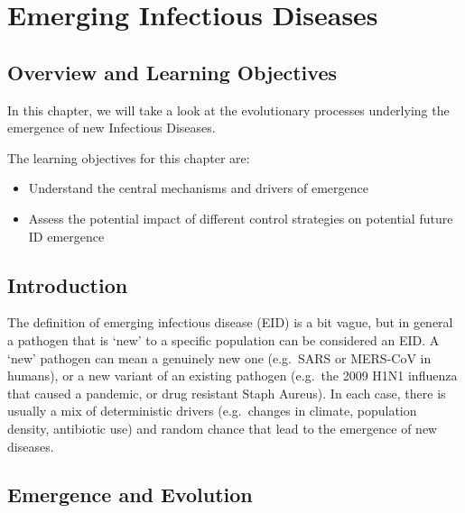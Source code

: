 \documentclass[
]{book}
\providecommand{\tightlist}{%
  \setlength{\itemsep}{0pt}\setlength{\parskip}{0pt}}
\begin{document}
\hypertarget{emerging-infectious-diseases}{%
\chapter{Emerging Infectious Diseases}\label{emerging-infectious-diseases}}

\hypertarget{overview-and-learning-objectives-15}{%
\section{Overview and Learning Objectives}\label{overview-and-learning-objectives-15}}

In this chapter, we will take a look at the evolutionary processes underlying the emergence of new Infectious Diseases.

The learning objectives for this chapter are:

\begin{itemize}
\tightlist
\item
  Understand the central mechanisms and drivers of emergence
\item
  Assess the potential impact of different control strategies on potential future ID emergence
\end{itemize}

\hypertarget{introduction-15}{%
\section{Introduction}\label{introduction-15}}

The definition of emerging infectious disease (EID) is a bit vague, but in general a pathogen that is `new' to a specific population can be considered an EID. A `new' pathogen can mean a genuinely new one (e.g.~SARS or MERS-CoV in humans), or a new variant of an existing pathogen (e.g.~the 2009 H1N1 influenza that caused a pandemic, or drug resistant Staph Aureus). In each case, there is usually a mix of deterministic drivers (e.g.~changes in climate, population density, antibiotic use) and random chance that lead to the emergence of new diseases.

\hypertarget{emergence-and-evolution}{%
\section{Emergence and Evolution}\label{emergence-and-evolution}}
\end{document}
